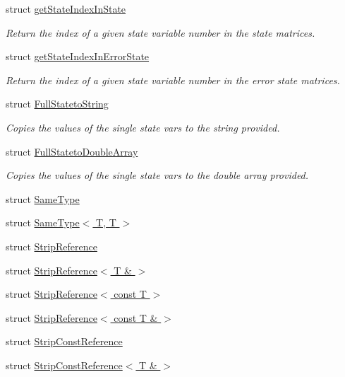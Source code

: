 \begin{DoxyCompactItemize}
struct \hyperlink{structmsf__tmp_1_1getStateIndexInState}{get\-State\-Index\-In\-State}
\begin{DoxyCompactList}\small\item\em Return the index of a given state variable number in the state matrices. \end{DoxyCompactList}\item 
struct \hyperlink{structmsf__tmp_1_1getStateIndexInErrorState}{get\-State\-Index\-In\-Error\-State}
\begin{DoxyCompactList}\small\item\em Return the index of a given state variable number in the error state matrices. \end{DoxyCompactList}\item 
struct \hyperlink{structmsf__tmp_1_1FullStatetoString}{Full\-Stateto\-String}
\begin{DoxyCompactList}\small\item\em Copies the values of the single state vars to the string provided. \end{DoxyCompactList}\item 
struct \hyperlink{structmsf__tmp_1_1FullStatetoDoubleArray}{Full\-Stateto\-Double\-Array}
\begin{DoxyCompactList}\small\item\em Copies the values of the single state vars to the double array provided. \end{DoxyCompactList}\item 
struct \hyperlink{structmsf__tmp_1_1SameType}{Same\-Type}
\item 
struct \hyperlink{structmsf__tmp_1_1SameType_3_01T_00_01T_01_4}{Same\-Type$<$ T, T $>$}
\item 
struct \hyperlink{structmsf__tmp_1_1StripReference}{Strip\-Reference}
\item 
struct \hyperlink{structmsf__tmp_1_1StripReference_3_01T_01_6_01_4}{Strip\-Reference$<$ T \& $>$}
\item 
struct \hyperlink{structmsf__tmp_1_1StripReference_3_01const_01T_01_4}{Strip\-Reference$<$ const T $>$}
\item 
struct \hyperlink{structmsf__tmp_1_1StripReference_3_01const_01T_01_6_01_4}{Strip\-Reference$<$ const T \& $>$}
\item 
struct \hyperlink{structmsf__tmp_1_1StripConstReference}{Strip\-Const\-Reference}
\item 
struct \hyperlink{structmsf__tmp_1_1StripConstReference_3_01T_01_6_01_4}{Strip\-Const\-Reference$<$ T \& $>$}

\end{DoxyCompactItemize}
